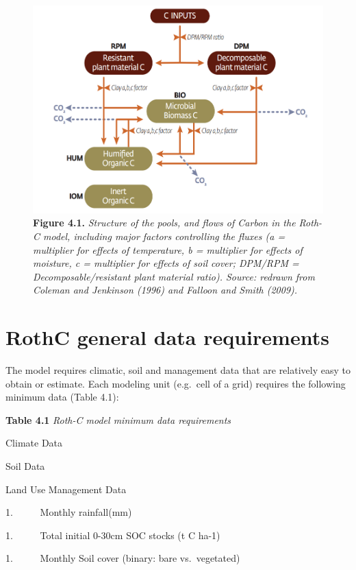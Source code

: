 \documentclass[
  10pt,
  b5paper,
]{book}
\begin{document}
\begin{figure}
\centering
\includegraphics{images/Figure_4.1.png}
\caption{\textbf{Figure 4.1.} \emph{Structure of the pools, and flows of Carbon in the Roth-C model, including major factors controlling the fluxes (a = multiplier for effects of temperature, b = multiplier for effects of moisture, c = multiplier for effects of soil cover; DPM/RPM = Decomposable/resistant plant material ratio). Source: redrawn from Coleman and Jenkinson (1996) and Falloon and Smith (2009).}}
\end{figure}

\hypertarget{rothc-general-data-requirements}{%
\section{RothC general data requirements}\label{rothc-general-data-requirements}}

The model requires climatic, soil and management data that are relatively easy to obtain or estimate. Each modeling unit (e.g.~cell of a grid) requires the following minimum data (Table 4.1):

\textbf{Table 4.1} \emph{Roth-C model minimum data requirements}

Climate Data

Soil Data

Land Use Management Data

1.~~~~~ Monthly rainfall(mm)

1.~~~~~ Total initial 0-30cm SOC stocks (t C ha-1)

1.~~~~~ Monthly Soil cover (binary: bare vs.~vegetated)
\end{document}
